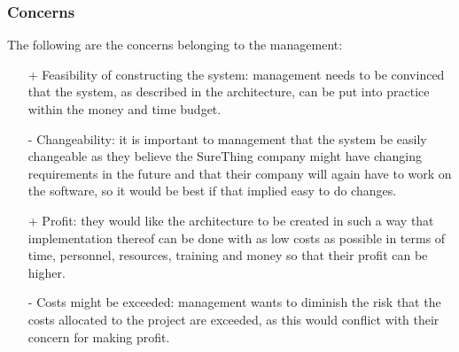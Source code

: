 \subsubsection{Concerns}
The following are the concerns belonging to the management:
\begin{itemize}
\item[+] Feasibility of constructing the system: management needs to
be convinced that the system, as described in the architecture, can be
put into practice within the money and time budget.
\item[-] Changeability: it is important to management that the
system be easily changeable as they believe the SureThing company might
have changing requirements in the future and that their company will
again have to work on the software, so it would be best if that implied
easy to do changes.
\item[+] Profit: they would like the architecture to be created in such
a way that implementation thereof can be done with as low costs as
possible in terms of time, personnel, resources, training and money
so that their profit can be higher.
\item[-] Costs might be exceeded: management wants to diminish the
risk that the costs allocated to the project are exceeded, as this would conflict
with their concern for making profit.
\end{itemize}
